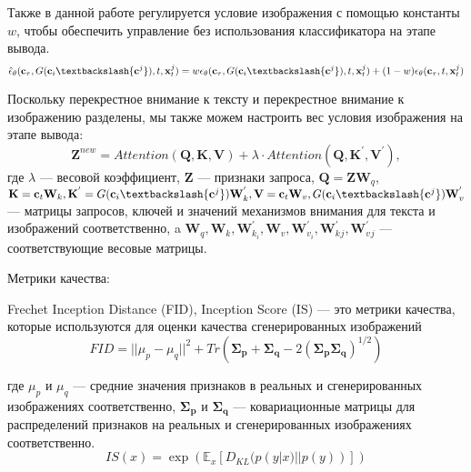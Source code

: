\documentclass{article}
\begin{document}
Также в данной работе регулируется условие изображения с помощью константы \(w\), чтобы обеспечить управление без использования классификатора на этапе вывода. 
\begin{equation}
\hat{\epsilon}_{\theta}(\mathbf{c}_{\tau}, G(\mathbf{c}_{i} \textbackslash \{\mathbf{c}^{j}\}), t, \mathbf{x}^{j}_{t}) = w\epsilon_{\theta}(\mathbf{c}_{\tau}, G(\mathbf{c}_{i} \textbackslash \{\mathbf{c}^{j}\}), t, \mathbf{x}^{j}_{t}) + (1-w)\epsilon_{\theta}(\mathbf{c}_{\tau}, t, \mathbf{x}^{j}_{t})
\end{equation}

Поскольку перекрестное внимание к тексту и перекрестное внимание к изображению разделены, мы также можем настроить вес условия изображения на этапе вывода:  
\begin{equation}
\mathbf{Z}^{new} = Attention(\mathbf{Q}, \mathbf{K}, \mathbf{V}) + \lambda \cdot Attention(\mathbf{Q}, \mathbf{K}^{'}, \mathbf{V}^{'}), 
\end{equation}
где $\lambda$ --- весовой коэффициент, $\mathbf{Z}$ --- признаки запроса, $\mathbf{Q} = \mathbf{Z}\mathbf{W}_q$, $\mathbf{K} = \mathbf{c}_t\mathbf{W}_k, \mathbf{K}^{'} = G(\mathbf{c}_i \textbackslash \{\mathbf{c}^j\}) {\mathbf{W}}^{'}_{k}, \mathbf{V} = \mathbf{c}_t\mathbf{W}_{v}, G(\mathbf{c}_i \textbackslash \{\mathbf{c}^j\}){\mathbf{W}}^{'}_{v}$ --- матрицы запросов, ключей и значений механизмов внимания для текста и изображений соответственно, a $\mathbf{W}_q, \mathbf{W}_k, {\mathbf{W}}^{'}_{k_i}, \mathbf{W}_v, {\mathbf{W}}^{'}_{v_i}, {\mathbf{W}}^{'}_k_j,{\mathbf{W}}^{'}_v_j$ --- соответствующие весовые матрицы. 

Метрики качества:

Frechet Inception Distance (FID), Inception Score (IS) --- это метрики качества, которые используются для оценки качества сгенерированных изображений
\begin{equation}
FID = ||\mu_p - \mu_q||^2 + Tr(\mathbf{\Sigma_p} + \mathbf{\Sigma_q} - 2(\mathbf{\Sigma_p}\mathbf{\Sigma_q})^{1/2})
\end{equation}

где \( \mu_p \) и \( \mu_q \) --- средние значения признаков в реальных и сгенерированных изображениях соответственно, \( \mathbf{\Sigma_p} \) и \( \mathbf{\Sigma_q} \) --- ковариационные матрицы для распределений признаков на реальных и сгенерированных изображениях соответственно.
\begin{equation}
IS(x) = \exp(\mathbb{E}_x \left[ D_{KL}(p(y | x) || p(y)) \right] )
\end{equation}
\end{document}
